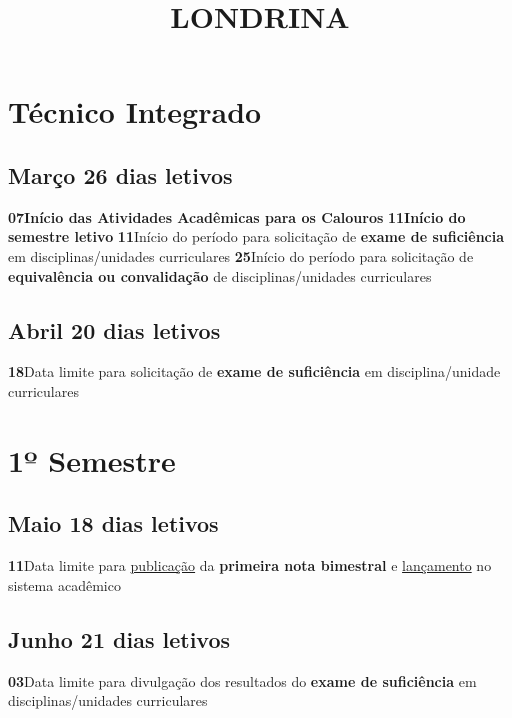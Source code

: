 \documentclass[thesis]{hmcposter}
\author{ }
\title{LONDRINA}
\begin{document}
\begin{poster}
\normalsize
				\section{\color{hmcorange}Técnico Integrado}\subsection{Março \hfill 26 dias letivos}\textbf{07}\qquad \textbf{Início das Atividades Acadêmicas para os Calouros} \newline \null\textbf{11}\qquad \textbf{Início do semestre letivo} \newline \null\textbf{11}\qquad Início do período para solicitação de \textbf{exame de suficiência} em disciplinas/unidades curriculares \newline \null\textbf{25}\qquad Início do período para solicitação de \textbf{equivalência ou convalidação} de disciplinas/unidades curriculares \newline \null\subsection{Abril \hfill 20 dias letivos}\textbf{18}\qquad Data limite para solicitação de \textbf{exame de suficiência} em disciplina/unidade curriculares \newline \null\vfill\null
\columnbreak
\section{\hfill \color{hmcorange}1º Semestre}
\subsection{Maio \hfill 18 dias letivos}\textbf{11}\qquad Data limite para \underline{publicação} da \textbf{primeira nota bimestral} e \underline{lançamento} no sistema acadêmico \newline \null\subsection{Junho \hfill 21 dias letivos}\textbf{03}\qquad Data limite para divulgação dos resultados do \textbf{exame de suficiência} em disciplinas/unidades curriculares \newline \null\newpage

\end{poster}
\end{document}
